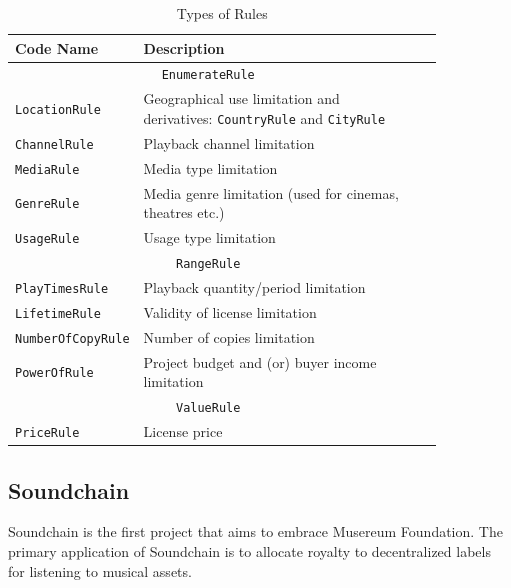 \documentclass[12pt]{report}
\def\code#1{\colorbox{light-gray}{\texttt{#1}}}
\begin{document}
\begin{table}[H]
\centering
\caption{Types of Rules}
\begin{tabular}{p{0.2\linewidth}p{0.65\linewidth}cc}
\toprule
Code Name & Description \\
\bottomrule
\toprule
\multicolumn{2}{c}{\code{EnumerateRule}} \\
\midrule
	\code{LocationRule} & Geographical use limitation and derivatives: \code{CountryRule} and \code{CityRule} \\
	\code{ChannelRule} & Playback channel limitation \\
	\code{MediaRule} & Media type limitation \\
	\code{GenreRule} & Media genre limitation (used for cinemas, theatres etc.) \\
	\code{UsageRule} & Usage type limitation \\
\bottomrule
\toprule
\multicolumn{2}{c}{\code{RangeRule}} \\
\midrule
	\code{PlayTimesRule} & Playback quantity/period limitation \\
	\code{LifetimeRule} & Validity of license limitation \\
	\code{NumberOfCopyRule} & Number of copies limitation \\
	\code{PowerOfRule} & Project budget and (or) buyer income limitation \\
\bottomrule
\toprule
\multicolumn{2}{c}{\code{ValueRule}} \\
\midrule
	\code{PriceRule} & License price \\
\bottomrule
\end{tabular}
\end{table}

\subsection{Soundchain}
\label{tech-apps-soundchain}
Soundchain is the first project that aims to embrace Musereum Foundation. The primary application of Soundchain is to allocate royalty to decentralized labels for listening to musical assets.
\end{document}
